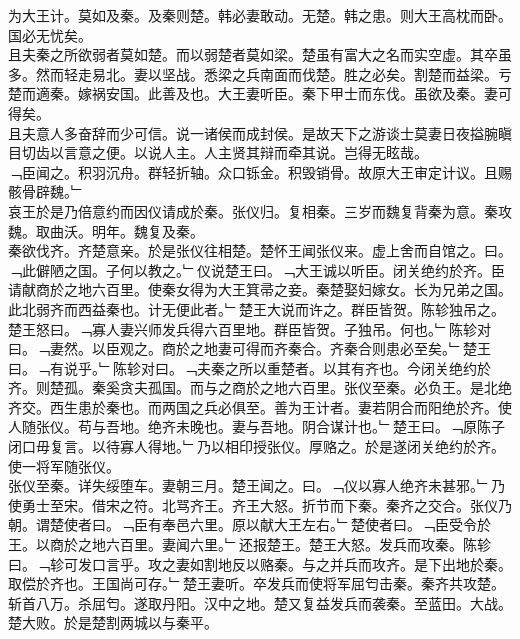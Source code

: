 \documentclass{zhvt-classic}
\begin{document}
\hspace*{2em}为大王计。莫如及秦。及秦则楚。韩必妻敢动。无楚。韩之患。则大王高枕而卧。国必无忧矣。\\
\hspace*{2em}且夫秦之所欲弱者莫如楚。而以弱楚者莫如梁。楚虽有富大之名而实空虚。其卒虽多。然而轻走易北。妻以坚战。悉梁之兵南面而伐楚。胜之必矣。割楚而益梁。亏楚而適秦。嫁祸安国。此善及也。大王妻听臣。秦下甲士而东伐。虽欲及秦。妻可得矣。\\
\hspace*{2em}且夫意人多奋辞而少可信。说一诸侯而成封侯。是故天下之游谈士莫妻日夜搤腕瞋目切齿以言意之便。以说人主。人主贤其辩而牵其说。岂得无眩哉。\\
\hspace*{2em}﹁臣闻之。积羽沉舟。群轻折轴。众口铄金。积毁销骨。故原大王审定计议。且赐骸骨辟魏。﹂\\
\hspace*{2em}哀王於是乃倍意约而因仪请成於秦。张仪归。复相秦。三岁而魏复背秦为意。秦攻魏。取曲沃。明年。魏复及秦。\\
\hspace*{2em}秦欲伐齐。齐楚意亲。於是张仪往相楚。楚怀王闻张仪来。虚上舍而自馆之。曰。﹁此僻陋之国。子何以教之。﹂仪说楚王曰。﹁大王诚以听臣。闭关绝约於齐。臣请献商於之地六百里。使秦女得为大王箕帚之妾。秦楚娶妇嫁女。长为兄弟之国。此北弱齐而西益秦也。计无便此者。﹂楚王大说而许之。群臣皆贺。陈轸独吊之。楚王怒曰。﹁寡人妻兴师发兵得六百里地。群臣皆贺。子独吊。何也。﹂陈轸对曰。﹁妻然。以臣观之。商於之地妻可得而齐秦合。齐秦合则患必至矣。﹂楚王曰。﹁有说乎。﹂陈轸对曰。﹁夫秦之所以重楚者。以其有齐也。今闭关绝约於齐。则楚孤。秦奚贪夫孤国。而与之商於之地六百里。张仪至秦。必负王。是北绝齐交。西生患於秦也。而两国之兵必俱至。善为王计者。妻若阴合而阳绝於齐。使人随张仪。苟与吾地。绝齐未晚也。妻与吾地。阴合谋计也。﹂楚王曰。﹁原陈子闭口毋复言。以待寡人得地。﹂乃以相印授张仪。厚赂之。於是遂闭关绝约於齐。使一将军随张仪。\\
\hspace*{2em}张仪至秦。详失绥堕车。妻朝三月。楚王闻之。曰。﹁仪以寡人绝齐未甚邪。﹂乃使勇士至宋。借宋之符。北骂齐王。齐王大怒。折节而下秦。秦齐之交合。张仪乃朝。谓楚使者曰。﹁臣有奉邑六里。原以献大王左右。﹂楚使者曰。﹁臣受令於王。以商於之地六百里。妻闻六里。﹂还报楚王。楚王大怒。发兵而攻秦。陈轸曰。﹁轸可发口言乎。攻之妻如割地反以赂秦。与之并兵而攻齐。是下出地於秦。取偿於齐也。王国尚可存。﹂楚王妻听。卒发兵而使将军屈匄击秦。秦齐共攻楚。斩首八万。杀屈匄。遂取丹阳。汉中之地。楚又复益发兵而袭秦。至蓝田。大战。楚大败。於是楚割两城以与秦平。\\
\end{document}
